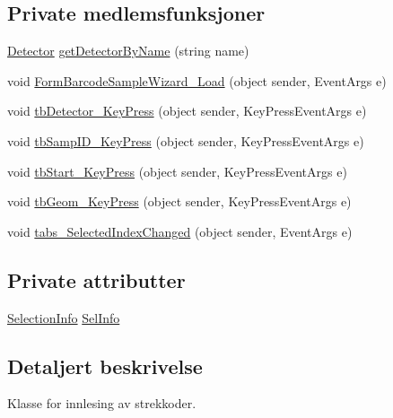 \subsection*{Private medlemsfunksjoner}
\begin{DoxyCompactItemize}
\item 
\hyperlink{class_scintilab_1_1_detector}{Detector} \hyperlink{class_scintilab_1_1_form_barcode_sample_wizard_ad7e7a4f0718e414a0a11cd67c1066e3f}{get\+Detector\+By\+Name} (string name)
\item 
void \hyperlink{class_scintilab_1_1_form_barcode_sample_wizard_aedb632713d205db58bfaf02452bf4253}{Form\+Barcode\+Sample\+Wizard\+\_\+\+Load} (object sender, Event\+Args e)
\item 
void \hyperlink{class_scintilab_1_1_form_barcode_sample_wizard_a0fc22d0ca8efcb9fa02e895e54ed73bf}{tb\+Detector\+\_\+\+Key\+Press} (object sender, Key\+Press\+Event\+Args e)
\item 
void \hyperlink{class_scintilab_1_1_form_barcode_sample_wizard_a24dc4accdbb66de035b1aadf197bb447}{tb\+Samp\+I\+D\+\_\+\+Key\+Press} (object sender, Key\+Press\+Event\+Args e)
\item 
void \hyperlink{class_scintilab_1_1_form_barcode_sample_wizard_a06b3a63f15b7731128a0e3a9386fe4fc}{tb\+Start\+\_\+\+Key\+Press} (object sender, Key\+Press\+Event\+Args e)
\item 
void \hyperlink{class_scintilab_1_1_form_barcode_sample_wizard_a02e631e389b7043be84002101ac0e0d1}{tb\+Geom\+\_\+\+Key\+Press} (object sender, Key\+Press\+Event\+Args e)
\item 
void \hyperlink{class_scintilab_1_1_form_barcode_sample_wizard_ab9b32380ef289e24ffd30a851152b936}{tabs\+\_\+\+Selected\+Index\+Changed} (object sender, Event\+Args e)
\end{DoxyCompactItemize}
\subsection*{Private attributter}
\begin{DoxyCompactItemize}
\item 
\hyperlink{class_scintilab_1_1_selection_info}{Selection\+Info} \hyperlink{class_scintilab_1_1_form_barcode_sample_wizard_abaafc00e1f7078936d2ff912da04c9af}{Sel\+Info}
\end{DoxyCompactItemize}


\subsection{Detaljert beskrivelse}
Klasse for innlesing av strekkoder. 

